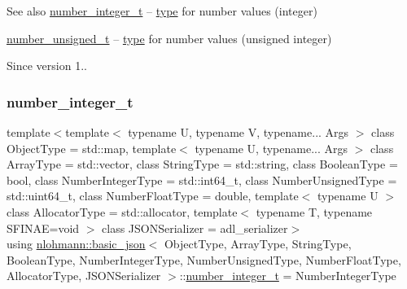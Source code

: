 \begin{DoxySeeAlso}{See also}
\mbox{\hyperlink{classnlohmann_1_1basic__json_a98e611d67b7bd75307de99c9358ab2dc}{number\+\_\+integer\+\_\+t}} -- \mbox{\hyperlink{classnlohmann_1_1basic__json_a2b2d781d7f2a4ee41bc0016e931cadf7}{type}} for number values (integer)

\mbox{\hyperlink{classnlohmann_1_1basic__json_ab906e29b5d83ac162e823ada2156b989}{number\+\_\+unsigned\+\_\+t}} -- \mbox{\hyperlink{classnlohmann_1_1basic__json_a2b2d781d7f2a4ee41bc0016e931cadf7}{type}} for number values (unsigned integer)
\end{DoxySeeAlso}
\begin{DoxySince}{Since}
version 1.. 
\end{DoxySince}
\mbox{\label{classnlohmann_1_1basic__json_a98e611d67b7bd75307de99c9358ab2dc}} 
\subsubsection{\texorpdfstring{number\_integer\_t}{number\_integer\_t}}
{\footnotesize\ttfamily template$<$template$<$ typename U, typename V, typename... Args $>$ class Object\+Type = std\+::map, template$<$ typename U, typename... Args $>$ class Array\+Type = std\+::vector, class String\+Type  = std\+::string, class Boolean\+Type  = bool, class Number\+Integer\+Type  = std\+::int64\+\_\+t, class Number\+Unsigned\+Type  = std\+::uint64\+\_\+t, class Number\+Float\+Type  = double, template$<$ typename U $>$ class Allocator\+Type = std\+::allocator, template$<$ typename T, typename S\+F\+I\+N\+A\+E=void $>$ class J\+S\+O\+N\+Serializer = adl\+\_\+serializer$>$ \\
using \mbox{\hyperlink{classnlohmann_1_1basic__json}{nlohmann\+::basic\+\_\+json}}$<$ Object\+Type, Array\+Type, String\+Type, Boolean\+Type, Number\+Integer\+Type, Number\+Unsigned\+Type, Number\+Float\+Type, Allocator\+Type, J\+S\+O\+N\+Serializer $>$\+::\mbox{\hyperlink{classnlohmann_1_1basic__json_a98e611d67b7bd75307de99c9358ab2dc}{number\+\_\+integer\+\_\+t}} =  Number\+Integer\+Type}



